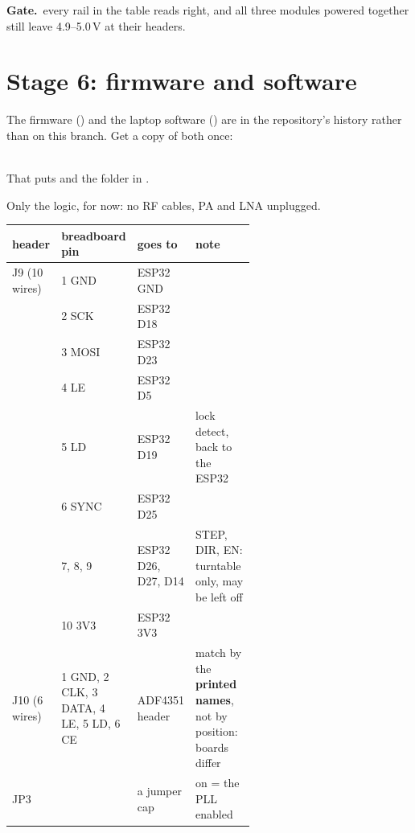 \documentclass[10pt]{article}
\newcommand{\gate}[1]{\begin{okbox}\textbf{\color{okgreen!70!black}Gate.}\ #1\end{okbox}}
\begin{document}
\gate{every rail in the table reads right, and all three modules powered together still leave 4.9–5.0\,V at their headers.}

\newpage
\section{Stage 6: firmware and software}\label{sec:fw}

The firmware () and the laptop software () are in the repository's history rather than on this branch. Get a copy of both once:

\begin{note}
\\[2pt]
That puts  and the  folder in .
\end{note}

Only the logic, for now: no RF cables, PA and LNA unplugged.

{\small
\begin{tabularx}{\linewidth}{@{}P{0.16\linewidth}P{0.22\linewidth}P{0.22\linewidth}L@{}}
\toprule
\textbf{header} & \textbf{breadboard pin} & \textbf{goes to} & \textbf{note} \\ \midrule
J9 (10 wires) & 1 GND & ESP32 GND & \\
 & 2 SCK & ESP32 D18 & \\
 & 3 MOSI & ESP32 D23 & \\
 & 4 LE & ESP32 D5 & \\
 & 5 LD & ESP32 D19 & lock detect, back to the ESP32 \\
 & 6 SYNC & ESP32 D25 & \\
 & 7, 8, 9 & ESP32 D26, D27, D14 & STEP, DIR, EN: turntable only, may be left off \\
 & 10 3V3 & ESP32 3V3 & \\
J10 (6 wires) & 1 GND, 2 CLK, 3 DATA, 4 LE, 5 LD, 6 CE & ADF4351 header & match by the \textbf{printed names}, not by position: boards differ \\
JP3 & & a jumper cap & on = the PLL enabled \\
\bottomrule
\end{tabularx}}
\end{document}
